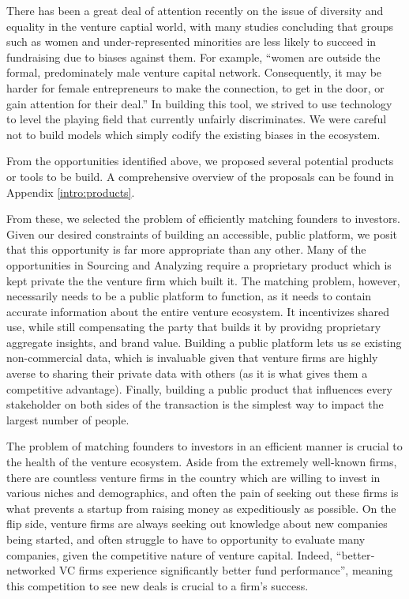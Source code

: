 There has been a great deal of attention recently on the issue of diversity and equality in the venture captial world, with many studies concluding that groups such as women and under-represented minorities are less likely to succeed in fundraising due to biases against them. For example, ``women are outside the formal, predominately male venture capital network. Consequently, it may be harder for female entrepreneurs to make the connection, to get in the door, or gain attention for their deal.''\cite{doi:10.1080/13691060118175} In building this tool, we strived to use technology to level the playing field that currently unfairly discriminates. We were careful not to build models which simply codify the existing biases in the ecosystem.

From the opportunities identified above, we proposed several potential products or tools to be build. A comprehensive overview of the proposals can be found in Appendix \ref{intro:products}.

From these, we selected the problem of efficiently matching founders to investors. Given our desired constraints of building an accessible, public platform, we posit that this opportunity is far more appropriate than any other. Many of the opportunities in Sourcing and Analyzing require a proprietary product which is kept private the the venture firm which built it. The matching problem, however, necessarily needs to be a public platform to function, as it needs to contain accurate information about the entire venture ecosystem. It incentivizes shared use, while still compensating the party that builds it by providng proprietary aggregate insights, and brand value. Building a public platform lets us se existing non-commercial data, which is invaluable given that venture firms are highly averse to sharing their private data with others (as it is what gives them a competitive advantage). Finally, building a public product that influences every stakeholder on both sides of the transaction is the simplest way to impact the largest number of people.

The problem of matching founders to investors in an efficient manner is crucial to the health of the venture ecosystem. Aside from the extremely well-known firms, there are countless venture firms in the country which are willing to invest in various niches and demographics, and often the pain of seeking out these firms is what prevents a startup from raising money as expeditiously as possible. On the flip side, venture firms are always seeking out knowledge about new companies being started, and often struggle to have to opportunity to evaluate many companies, given the competitive nature of venture capital. Indeed, ``better‐networked VC firms experience significantly better fund performance''\cite{doi:10.1111/j.1540-6261.2007.01207.x}, meaning this competition to see new deals is crucial to a firm's success.

